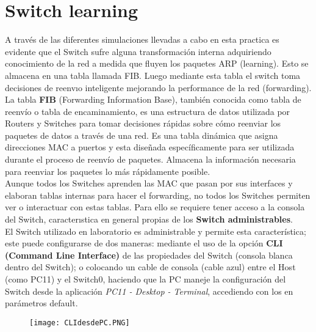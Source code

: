 \documentclass{article}
\begin{document}
\section{Switch learning}

A través de las diferentes simulaciones llevadas a cabo en esta practica es evidente que el Switch sufre alguna transformación interna adquiriendo conocimiento de la red a medida que fluyen los paquetes ARP (learning). Esto se almacena en una tabla llamada FIB. Luego mediante esta tabla el switch toma decisiones de reenvıo inteligente mejorando la performance de la red (forwarding).\\

{\setlength{\parindent}{1pt} La tabla \textbf{FIB} (Forwarding Information Base), también conocida como tabla de reenvío o tabla de encaminamiento, es una estructura de datos utilizada por Routers y Switches para tomar decisiones rápidas sobre cómo reenviar los paquetes de datos a través de una red. Es una tabla dinámica que asigna direcciones MAC a puertos y esta diseñada específicamente para ser utilizada durante el proceso de reenvío de paquetes. Almacena la información necesaria para reenviar los paquetes lo más rápidamente posible.\\

Aunque todos los Switches aprenden las MAC que pasan por sus interfaces y elaboran tablas internas para hacer el forwarding, no todos los Switches permiten ver o interactuar con estas tablas. Para ello se requiere tener acceso a la consola del Switch, caracterıstica en general propias de los \textbf{Switch administrables}.\\

El Switch utilizado en laboratorio es administrable y permite esta característica; este puede configurarse de dos maneras: mediante el uso de la opción \textbf{CLI (Command Line Interface)} de las propiedades del Switch (consola blanca dentro del Switch); o colocando un cable de consola (cable azul) entre el Host (como PC11) y el Switch0, haciendo que la PC maneje la configuración del Switch desde la aplicación \textit{PC11 - Desktop - Terminal}, accediendo con los en parámetros default.\\ }

\newpage 

\begin{figure}
    \centering
    \texttt{[image: CLIdesdePC.PNG]}
\end{figure}
\end{document}
